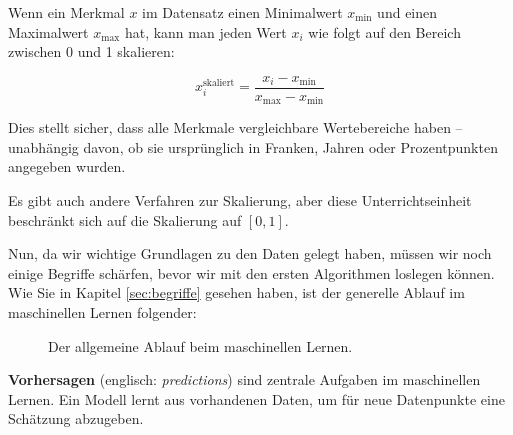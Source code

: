 \begin{lpu}
\begin{theorie}
Wenn ein Merkmal \( x \) im Datensatz einen Minimalwert \( x_{\text{min}} \) und einen Maximalwert \( x_{\text{max}} \) hat, kann man jeden Wert \( x_i \) wie folgt auf den Bereich zwischen 0 und 1 skalieren:

\[
x_i^{\text{skaliert}} = \frac{x_i - x_{\text{min}}}{x_{\text{max}} - x_{\text{min}}}
\]

Dies stellt sicher, dass alle Merkmale vergleichbare Wertebereiche haben – unabhängig davon, ob sie ursprünglich in Franken, Jahren oder Prozentpunkten angegeben wurden.
\end{theorie}

Es gibt auch andere Verfahren zur Skalierung, aber diese Unterrichtseinheit beschränkt sich auf die Skalierung auf $[0,1]$.

Nun, da wir wichtige Grundlagen zu den Daten gelegt haben, müssen wir noch einige Begriffe schärfen, bevor wir mit den ersten Algorithmen loslegen können. Wie Sie in Kapitel \ref{sec:begriffe} gesehen haben, ist der generelle Ablauf im maschinellen Lernen folgender:

\begin{figure}
\begin{center}
\end{center}
\caption{Der allgemeine Ablauf beim maschinellen Lernen.}
\end{figure}


\begin{theorie}
\textbf{Vorhersagen} (englisch: \emph{predictions}) sind zentrale Aufgaben im maschinellen Lernen. Ein Modell lernt aus vorhandenen Daten, um f\"ur neue Datenpunkte eine Sch\"atzung abzugeben.


\end{theorie}
\end{lpu}
